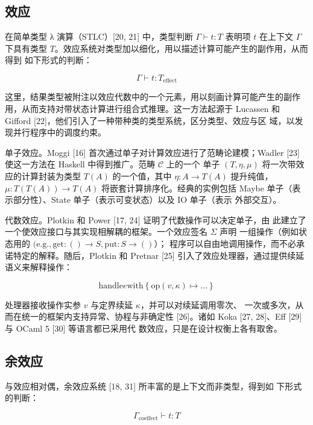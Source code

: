 \documentclass[
  10
]{article}
\begin{document}
\subsection{效应} \label{efects}

在简单类型 λ 演算（STLC）{[}20, 21{]} 中，类型判断
\(\Gamma \vdash t : T\) 表明项 \(t\) 在上下文 $\Gamma$ 下具有类型
\(T\)。效应系统对类型加以细化，用以描述计算可能产生的副作用，从而得到
如下形式的判断：

\[
\Gamma \vdash t : T _ { \mathrm { e f f e c t } }\tag{1}
\]

这里，结果类型被附注以效应代数中的一个元素，用以刻画计算可能产生的副作
用，从而支持对带状态计算进行组合式推理。这一方法起源于 Lucassen 和
Gifford {[}22{]}，他们引入了一种带种类的类型系统，区分类型、效应与区
域，以发现并行程序中的调度约束。

单子效应。Moggi {[}16{]} 首次通过单子对计算效应进行了范畴论建模；Wadler
{[}23{]} 使这一方法在 Haskell 中得到推广。范畴 \(\mathcal{C}\) 上的一个
单子 \(( T , \eta , \mu )\) 将一次带效应的计算封装为类型 \(T ( A )\)
的一个值，其中 \(\eta : A \to T ( A )\) 提升纯值，
\(\mu : T ( T ( A ) ) \to T ( A )\) 将嵌套计算排序化。经典的实例包括
Maybe 单子（表示部分性）、State 单子（表示可变状态）以及 IO 单子（表示
外部交互）。

代数效应。Plotkin 和 Power {[}17, 24{]} 证明了代数操作可以决定单子，由
此建立了一个使效应接口与其实现相解耦的框架。一个效应签名 $\Sigma$ 声明
一组操作（例如状态用的
\(( \mathrm { e . g . , g e t : } ( ) \to S , \mathrm { p u t : } S \to ( )\)）；
程序可以自由地调用操作，而不必承诺特定的解释。随后，Plotkin 和 Pretnar
{[}25{]} 引入了效应处理器，通过提供续延语义来解释操作：

\[
\mathrm { h a n d l e } e \mathrm { w i t h } \left\{ \mathrm { o p } ( v , \kappa ) \mapsto \dots \right\}\tag{2}
\]

处理器接收操作实参 \(v\) 与定界续延 \(\kappa\)，并可以对续延调用零次、
一次或多次，从而在统一的框架内支持异常、协程与非确定性 {[}26{]}。诸如
Koka {[}27, 28{]}、Eff {[}29{]} 与 OCaml 5 {[}30{]} 等语言都已采用代
数效应，只是在设计权衡上各有取舍。

\subsection{余效应} \label{coefects}

与效应相对偶，余效应系统 {[}18, 31{]} 所丰富的是上下文而非类型，得到如
下形式的判断：

\[
\Gamma _ { \mathrm { c o e f f e c t } } \vdash t : T\tag{3}
\]
\end{document}
